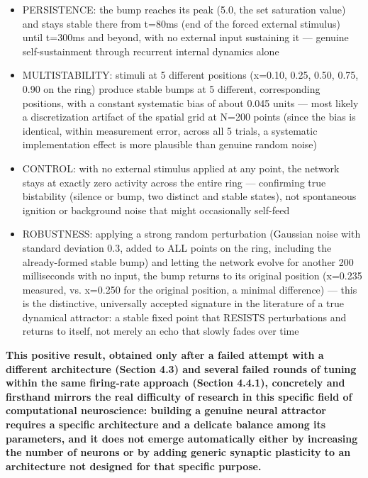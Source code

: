 \documentclass[
  english,
]{article}
\begin{document}
\begin{itemize}
\item
  PERSISTENCE: the bump reaches its peak (5.0, the set saturation value) and stays stable there from t=80ms (end of the forced external stimulus) until t=300ms and beyond, with no external input sustaining it --- genuine self-sustainment through recurrent internal dynamics alone
\item
  MULTISTABILITY: stimuli at 5 different positions (x=0.10, 0.25, 0.50, 0.75, 0.90 on the ring) produce stable bumps at 5 different, corresponding positions, with a constant systematic bias of about 0.045 units --- most likely a discretization artifact of the spatial grid at N=200 points (since the bias is identical, within measurement error, across all 5 trials, a systematic implementation effect is more plausible than genuine random noise)
\item
  CONTROL: with no external stimulus applied at any point, the network stays at exactly zero activity across the entire ring --- confirming true bistability (silence or bump, two distinct and stable states), not spontaneous ignition or background noise that might occasionally self-feed
\item
  ROBUSTNESS: applying a strong random perturbation (Gaussian noise with standard deviation 0.3, added to ALL points on the ring, including the already-formed stable bump) and letting the network evolve for another 200 milliseconds with no input, the bump returns to its original position (x=0.235 measured, vs. x=0.250 for the original position, a minimal difference) --- this is the distinctive, universally accepted signature in the literature of a true dynamical attractor: a stable fixed point that RESISTS perturbations and returns to itself, not merely an echo that slowly fades over time
\end{itemize}

\textbf{This positive result, obtained only after a failed attempt with a different architecture (Section 4.3) and several failed rounds of tuning within the same firing-rate approach (Section 4.4.1), concretely and firsthand mirrors the real difficulty of research in this specific field of computational neuroscience: building a genuine neural attractor requires a specific architecture and a delicate balance among its parameters, and it does not emerge automatically either by increasing the number of neurons or by adding generic synaptic plasticity to an architecture not designed for that specific purpose.}
\end{document}
